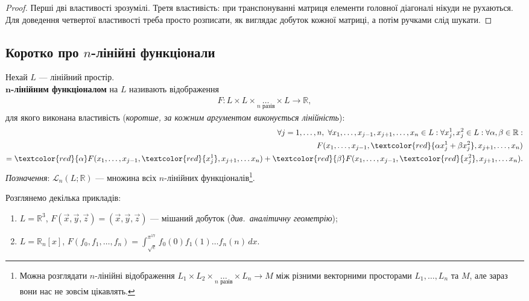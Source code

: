 \documentclass{math_library}
\begin{document}
	\begin{proof}
	Перші дві властивості зрозумілі. Третя властивість: при транспонуванні матриця елементи головної діагоналі нікуди не рухаються. Для доведення четвертої властивості треба просто розписати, як виглядає добуток кожної матриці, а потім ручками слід шукати.
	\end{proof}
	
	\subsection{Коротко про $n$-лінійні функціонали}
	\begin{definition}
	\label{def_polylinear_functional}
	Нехай $L$ --- лінійний простір.\\
	\textbf{$\bm{n}$-лінійним функціоналом} на $L$ називають відображення 
	\begin{align*}
	F \colon L \times L \times \underset{n\text{ разів}}{\dots} \times L \to \mathbb{R},
	\end{align*}
	для якого виконана властивість (\textit{коротше, за кожним аргументом виконується лінійність}):
	\begin{align*}
	\forall j = 1,\dots,n,\ \forall x_1,\dots,x_{j-1}, x_{j+1}, \dots, x_n \in L: \forall x_j^1, x_j^2 \in L: \forall \alpha, \beta \in \mathbb{R}:\\
	F(x_1,\dots,x_{j-1}, \textcolor{red}{\alpha x_j^1 + \beta x_j^2}, x_{j+1}, \dots, x_n) \\ = \textcolor{red}{\alpha} F(x_1, \dots, x_{j-1}, \textcolor{red}{x_j^1}, x_{j+1}, \dots x_n) + \textcolor{red}{\beta} F(x_1, \dots, x_{j-1}, \textcolor{red}{x_j^2}, x_{j+1}, \dots x_n).
	\end{align*}
	\textit{Позначення}: $\mathcal{L}_n(L;\mathbb{R})$ --- множина всіх $n$-лінійних функціоналів\footnote{Можна розглядати $n$-лінійні відображення $L_1 \times L_2 \times \underset{n\text{ разів}}{\dots} \times L_n \to M$ між різними векторними просторами $L_1,\dots,L_n$ та $M$, але зараз вони нас не зовсім цікавлять.}.
	\end{definition}
	
	\begin{example} Розглянемо декілька прикладів:
	\begin{enumerate}[nosep, wide=0pt, label={\arabic*.}]
	\item $L = \mathbb{R}^3$, \quad $F(\vec{x},\vec{y},\vec{z}) = (\vec{x}, \vec{y}, \vec{z})$ --- мішаний добуток (\textit{див.\ аналітичну геометрію});
	\item $L = \mathbb{R}_n[x]$, \quad $F(f_0,f_1,\dots,f_n) = \displaystyle \int_{\sqrt{e}}^{\pi^{17}} f_0(0)f_1(1)\dots f_n(n) \,dx$.
	\end{enumerate}
	\end{example}
	
\end{document}
